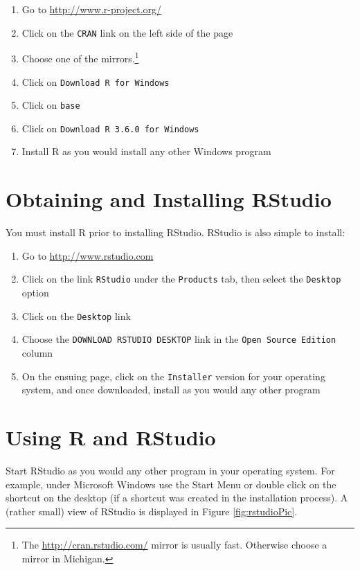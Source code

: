 \documentclass[]{krantz}
\providecommand{\tightlist}{%
  \setlength{\itemsep}{0pt}\setlength{\parskip}{0pt}}
\begin{document}
\begin{enumerate}
\def\labelenumi{\arabic{enumi}.}
\tightlist
\item
  Go to \url{http://www.r-project.org/}
\item
  Click on the \texttt{CRAN} link on the left side of the page
\item
  Choose one of the mirrors.\footnote{The \url{http://cran.rstudio.com/} mirror is usually fast. Otherwise choose a mirror in Michigan.}
\item
  Click on \texttt{Download\ R\ for\ Windows}
\item
  Click on \texttt{base}
\item
  Click on \texttt{Download\ R\ 3.6.0\ for\ Windows}
\item
  Install R as you would install any other Windows program
\end{enumerate}

\hypertarget{obtaining-and-installing-rstudio}{%
\section{Obtaining and Installing RStudio}\label{obtaining-and-installing-rstudio}}

You must install R prior to installing RStudio. RStudio is also simple to install:

\begin{enumerate}
\def\labelenumi{\arabic{enumi}.}
\tightlist
\item
  Go to \url{http://www.rstudio.com}
\item
  Click on the link \texttt{RStudio} under the \texttt{Products} tab, then select the \texttt{Desktop} option
\item
  Click on the \texttt{Desktop} link
\item
  Choose the \texttt{DOWNLOAD\ RSTUDIO\ DESKTOP} link in the \texttt{Open\ Source\ Edition} column
\item
  On the ensuing page, click on the \texttt{Installer} version for your operating system, and once downloaded, install as you would any other program
\end{enumerate}

\hypertarget{using-r-and-rstudio}{%
\section{Using R and RStudio}\label{using-r-and-rstudio}}

Start RStudio as you would any other program in your operating system. For example, under Microsoft Windows use the Start Menu or double click on the shortcut on the desktop (if a shortcut was created in the installation process). A (rather small) view of RStudio is displayed in Figure \ref{fig:rstudioPic}.
\end{document}
